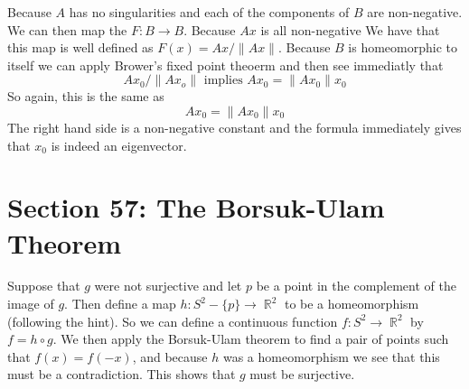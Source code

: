 \documentclass{article}
\DeclareMathOperator{\R}{\mathbb{R}}
\newcommand{\exercise}[1]{\noindent{\textbf{Exercise #1:}}}
\newcommand{\norm}[1]{\|#1\|}
\begin{document}
Because $A$ has no singularities and each of the components of $B$ are
non-negative. We can then map the $F: B \to B$. Because $Ax$ is all
non-negative We have that this map is well defined as $F(x) =
Ax/\norm{Ax}$. Because $B$ is homeomorphic to itself we can apply
Brower's fixed point theoerm and then see immediatly that
\[
Ax_0/\norm{Ax_o} \text{ implies } Ax_0 = \norm{Ax_0}x_0
\]
So again, this is the same as
\[
Ax_0 = \norm{Ax_0}x_0
\]
The right hand side is a non-negative constant and the formula
immediately gives that $x_0$ is indeed an eigenvector.

\section{Section 57: The Borsuk-Ulam Theorem}

\exercise{57.2}

Suppose that $g$ were not surjective and let $p$ be a point in the
complement of the image of $g$. Then define a map $h: S^2-\{p\} \to
\R^2$ to be a homeomorphism (following the hint). So we can define a
continuous function $f: S^2 \to \R^2$ by $f = h\circ g$. We then apply
the Borsuk-Ulam theorem to find a pair of points such that $f(x) =
f(-x)$, and because $h$ was a homeomorphism we see that this must be a
contradiction. This shows that $g$ must be surjective.
\end{document}
